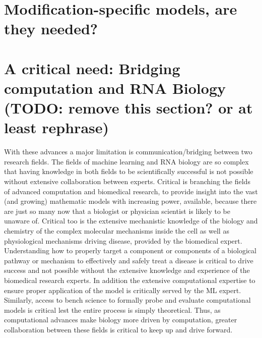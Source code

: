 \documentclass{report}
\begin{document}
\section{Modification-specific models, are they needed?}



\section{A critical need: Bridging computation and RNA Biology (TODO: remove this section? or at least rephrase)}

With these advances a major limitation is communication/bridging between two research fields. The fields of machine learning and RNA biology are so complex that having knowledge in both fields to be scientifically successful is not possible without extensive collaboration between experts.  Critical is branching the fields of advanced computation and biomedical research, to provide insight into the vast (and growing) mathematic models with increasing power, available, because there are just so many now that a biologist or physician scientist is likely to be unaware of. Critical too is the extensive mechanistic knowledge of the biology and chemistry of the complex molecular mechanisms inside the cell as well as physiological mechanisms driving disease, provided by the biomedical expert. Understanding how to properly target a component or components of a biological pathway or mechanism to effectively and safely treat a disease is critical to drive success and not possible without the extensive knowledge and experience of the biomedical research experts. In addition the extensive computational expertise to ensure proper application of the model is critically served by the ML expert. Similarly, access to bench science to formally probe and evaluate computational models is critical lest the entire process is simply theoretical. Thus, as computational advances make biology more driven by computation, greater collaboration between these fields is critical to keep up and drive forward.













\end{document}
